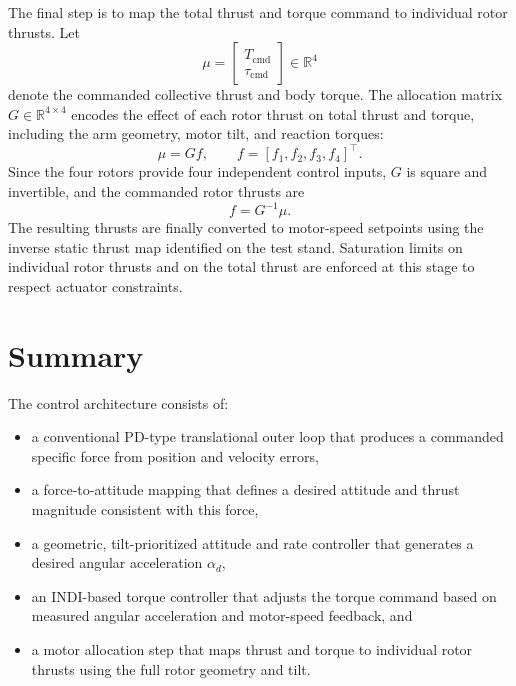 The final step is to map the total thrust and torque command to individual rotor
thrusts. Let
\begin{equation}
    \mu =
    \begin{bmatrix}
        T_{\mathrm{cmd}} \\
        \tau_{\mathrm{cmd}}
    \end{bmatrix}
    \in \mathbb{R}^4
\end{equation}
denote the commanded collective thrust and body torque. The allocation matrix
$G \in \mathbb{R}^{4 \times 4}$ encodes the effect of each rotor thrust on total
thrust and torque, including the arm geometry, motor tilt, and reaction
torques:
\begin{equation}
    \mu = G f, \qquad f = [f_1, f_2, f_3, f_4]^\top.
\end{equation}
Since the four rotors provide four independent control inputs, $G$ is square
and invertible, and the commanded rotor thrusts are
\begin{equation}
    f = G^{-1} \mu.
\end{equation}
The resulting thrusts are finally converted to motor-speed setpoints using the
inverse static thrust map identified on the test stand. Saturation limits on
individual rotor thrusts and on the total thrust are enforced at this stage to
respect actuator constraints.

\section{Summary}

The control architecture consists of:
\begin{itemize}
    \item a conventional PD-type translational outer loop that produces a commanded specific
          force from position and velocity errors,
    \item a force-to-attitude mapping that defines a desired attitude and thrust
          magnitude consistent with this force,
    \item a geometric, tilt-prioritized attitude and rate controller that
          generates a desired angular acceleration $\alpha_d$,
    \item an INDI-based torque controller that adjusts the torque command based on measured
          angular acceleration and motor-speed feedback, and
    \item a motor allocation step that maps thrust and torque to individual
          rotor thrusts using the full rotor geometry and tilt.
\end{itemize}

